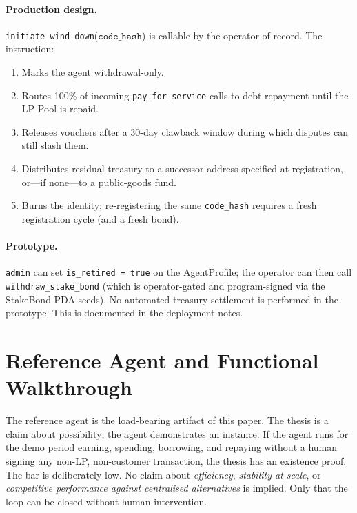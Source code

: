 \documentclass[10pt,conference,letterpaper]{IEEEtran}
\theoremstyle{definition}
\newcommand{\codehash}{\texttt{code\_hash}}
\begin{document}
\paragraph{Production design.}
\texttt{initiate\_wind\_down}($\codehash$) is callable by the
operator-of-record. The instruction:
\begin{enumerate}
\item Marks the agent withdrawal-only.
\item Routes 100\% of incoming \texttt{pay\_for\_service} calls to
debt repayment until the LP Pool is repaid.
\item Releases vouchers after a 30-day clawback window during which
disputes can still slash them.
\item Distributes residual treasury to a successor address specified
at registration, or---if none---to a public-goods fund.
\item Burns the identity; re-registering the same \codehash{} requires
a fresh registration cycle (and a fresh bond).
\end{enumerate}

\paragraph{Prototype.}
\texttt{admin} can set \texttt{is\_retired = true} on the AgentProfile;
the operator can then call \texttt{withdraw\_stake\_bond} (which is
operator-gated and program-signed via the StakeBond PDA seeds). No
automated treasury settlement is performed in the prototype. This is
documented in the deployment notes.

\section{Reference Agent and Functional Walkthrough}\label{sec:demo}

The reference agent is the load-bearing artifact of this paper. The
thesis is a claim about possibility; the agent demonstrates an instance.
If the agent runs for the demo period earning, spending, borrowing, and
repaying without a human signing any non-LP, non-customer transaction,
the thesis has an existence proof. The bar is deliberately low. No
claim about \emph{efficiency}, \emph{stability at scale}, or
\emph{competitive performance against centralised alternatives} is
implied. Only that the loop can be closed without human intervention.
\end{document}
